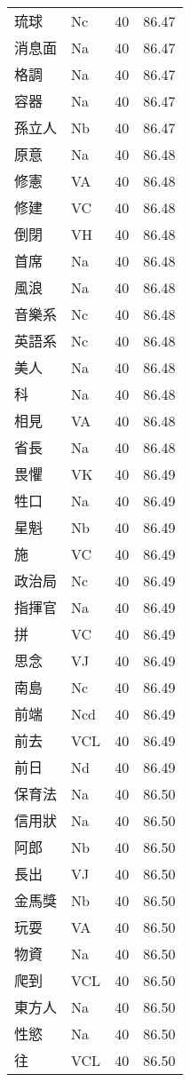 \documentclass[twocolumn]{book}
\begin{document}
\begin{supertabular}{llrr}
琉球 & Nc & 40 &  86.47\\
消息面 & Na & 40 &  86.47\\
格調 & Na & 40 &  86.47\\
容器 & Na & 40 &  86.47\\
孫立人 & Nb & 40 &  86.47\\
原意 & Na & 40 &  86.48\\
修憲 & VA & 40 &  86.48\\
修建 & VC & 40 &  86.48\\
倒閉 & VH & 40 &  86.48\\
首席 & Na & 40 &  86.48\\
風浪 & Na & 40 &  86.48\\
音樂系 & Nc & 40 &  86.48\\
英語系 & Nc & 40 &  86.48\\
美人 & Na & 40 &  86.48\\
科 & Na & 40 &  86.48\\
相見 & VA & 40 &  86.48\\
省長 & Na & 40 &  86.48\\
畏懼 & VK & 40 &  86.49\\
牲口 & Na & 40 &  86.49\\
星魁 & Nb & 40 &  86.49\\
施 & VC & 40 &  86.49\\
政治局 & Nc & 40 &  86.49\\
指揮官 & Na & 40 &  86.49\\
拼 & VC & 40 &  86.49\\
思念 & VJ & 40 &  86.49\\
南島 & Nc & 40 &  86.49\\
前端 & Ncd & 40 &  86.49\\
前去 & VCL & 40 &  86.49\\
前日 & Nd & 40 &  86.49\\
保育法 & Na & 40 &  86.50\\
信用狀 & Na & 40 &  86.50\\
阿郎 & Nb & 40 &  86.50\\
長出 & VJ & 40 &  86.50\\
金馬獎 & Nb & 40 &  86.50\\
玩耍 & VA & 40 &  86.50\\
物資 & Na & 40 &  86.50\\
爬到 & VCL & 40 &  86.50\\
東方人 & Na & 40 &  86.50\\
性慾 & Na & 40 &  86.50\\
往 & VCL & 40 &  86.50\\

\end{supertabular}
\end{document}
